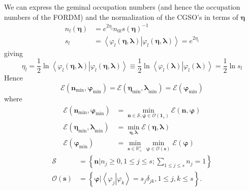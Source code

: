 \documentclass[aps,preprint]{revtex4}%
\begin{document}
We can express the geminal occupation numbers (and hence the occupation
numbers of the FORDM) and the normalization of the CGSO's in terms of
$\boldsymbol{\eta}$
\begin{align}
n_{l}\left(  \boldsymbol{\eta}\right)   &  =e^{2\eta_{l}}n_{0l}\mathit{s}%
\left(  \boldsymbol{\eta}\right)  ^{-1}\nonumber\\
s_{l}  &  =\left\langle \left.  \varphi_{l}\left(  \boldsymbol{\eta,\lambda
}\right)  \right\vert \varphi_{l}\left(  \boldsymbol{\eta,\lambda}\right)
\right\rangle =e^{2\eta_{l}}%
\end{align}
giving
\begin{equation}
\eta_{l}=\frac{1}{2}\ln\left\langle \left.  \varphi_{l}\left(
\boldsymbol{\eta,\lambda}\right)  \right\vert \varphi_{l}\left(
\boldsymbol{\eta,\lambda}\right)  \right\rangle \equiv\frac{1}{2}%
\ln\left\langle \left.  \varphi_{l}\left(  \boldsymbol{\lambda}\right)
\right\vert \varphi_{l}\left(  \boldsymbol{\lambda}\right)  \right\rangle
=\frac{1}{2}\ln s_{l}%
\end{equation}
Hence%
\begin{equation}
\mathcal{E}\left(  \boldsymbol{n}_{\min}\boldsymbol{,\varphi}_{\min}\right)
=\mathcal{E}\left(  \boldsymbol{\eta}_{\min}\boldsymbol{,\lambda}_{\min
}\right)  =\mathcal{E}\left(  \boldsymbol{\varphi}_{\min}\right)
\end{equation}
where
\begin{align}
\mathcal{E}\left(  \boldsymbol{n}_{\min}\boldsymbol{,\varphi}_{\min}\right)
&  =\min_{\boldsymbol{n\in\mathcal{S},\varphi\in}\mathcal{O}\left(
\boldsymbol{1}_{s}\right)  }\mathcal{E}\left(  \boldsymbol{n,\varphi}\right)
\\
\mathcal{E}\left(  \boldsymbol{\eta}_{\min}\boldsymbol{,\lambda}_{\min
}\right)   &  =\min_{\boldsymbol{\eta,\lambda}}\mathcal{E}\left(
\boldsymbol{\eta,\lambda}\right) \\
\mathcal{E}\left(  \boldsymbol{\varphi}_{\min}\right)   &  =\min
_{\boldsymbol{s\in}\mathbb{R}_{+}^{s}}\min_{\boldsymbol{\varphi\in}%
\mathcal{O}\left(  \boldsymbol{s}\right)  }\mathcal{E}\left(
\boldsymbol{\varphi}\right)
\end{align}%
\begin{align}
\mathcal{S}  &  =\left\{  \left.  \boldsymbol{n}\right\vert n_{j}\geq0,1\leq
j\leq s;\sum_{1\leq j\leq s}n_{j}=1\right\} \\
\mathcal{O}\left(  \boldsymbol{s}\right)   &  =\left\{  \left.
\boldsymbol{\varphi}\right\vert \left\langle \left.  \varphi_{j}\right\vert
\varphi_{k}\right\rangle =s_{j}\delta_{jk},1\leq j,k\leq s\right\}  .
\end{align}%
\end{document}
